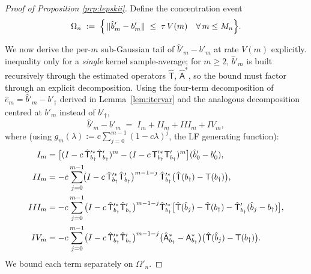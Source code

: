 \begin{proof}[Proof of Proposition \ref{prp:lepskii}]
Define the concentration event %
\begin{equation}\label{eq:Omegan}
\Omega_n \;:=\; \Bigl\{\,\|\hat b'_m - b'_m\| \;\le\; \tau\,V(m)\quad
\forall\, m \le M_n\Bigr\}.
\end{equation}

We now derive the per-$m$ sub-Gaussian tail of $\hat b'_m - b'_m$ at
rate $V(m)$ explicitly. \citet[Theorem~6]{hansen2008} %
inequality only for a \emph{single} kernel sample-average; for $m \ge 2$,
$\hat b'_m$ is built recursively through the estimated operators
$\hat{\mathsf T}$, $\hat{\mathsf A}^{*}$, so the bound must factor through
an explicit decomposition. Using the four-term decomposition of
$\hat e_m = \hat b'_m - b'_\dagger$ derived in Lemma~\ref{lem:itervar} and
the analogous decomposition centred at $b'_m$ instead of $b'_\dagger$,
\begin{equation}\label{eq:fourterm}
\hat b'_m - b'_m \;=\; I_m + II_m + III_m + IV_m,
\end{equation}
where (using $g_m(\lambda) := c\sum_{j=0}^{m-1}(1 - c\lambda)^j$, the LF
generating function):
\begin{align}
I_m   &= \bigl[(I - c\,\hat{\mathsf T}'^{*}_{b_\dagger}\hat{\mathsf T}'_{b_\dagger})^{m}
       - (I - c\,\mathsf T'^{*}_{b_\dagger}\mathsf T'_{b_\dagger})^{m}\bigr](\hat b'_0 - b'_0), \notag\\
II_m  &= -c\sum_{j=0}^{m-1}\!\bigl(I - c\,\hat{\mathsf T}'^{*}_{b_\dagger}\hat{\mathsf T}'_{b_\dagger}\bigr)^{m-1-j}\,
        \hat{\mathsf T}'^{*}_{b_\dagger}\bigl(\hat{\mathsf T}(b_\dagger) - \mathsf T(b_\dagger)\bigr), \notag\\
III_m &= -c\sum_{j=0}^{m-1}\bigl(I - c\,\hat{\mathsf T}'^{*}_{b_\dagger}\hat{\mathsf T}'_{b_\dagger}\bigr)^{m-1-j}
        \hat{\mathsf T}'^{*}_{b_\dagger}\bigl[\hat{\mathsf T}(\hat b_j) - \hat{\mathsf T}(b_\dagger)
        - \hat{\mathsf T}'_{b_\dagger}(\hat b_j - b_\dagger)\bigr], \notag\\
IV_m  &= -c\sum_{j=0}^{m-1}\bigl(I - c\,\hat{\mathsf T}'^{*}_{b_\dagger}\hat{\mathsf T}'_{b_\dagger}\bigr)^{m-1-j}
        \bigl(\hat{\mathsf A}^{*}_{b_\dagger} - \mathsf A^{*}_{b_\dagger}\bigr)\bigl(\hat{\mathsf T}(\hat b_j) - \mathsf T(b_\dagger)\bigr). \notag
\end{align}
We bound each term separately on $\Omega'_n$.


\end{proof}
